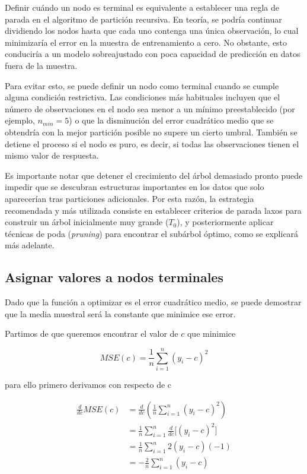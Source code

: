 Definir cuándo un nodo es terminal es equivalente a establecer una regla de parada en el algoritmo de partición recursiva. En teoría, se podría continuar dividiendo los nodos hasta que cada uno contenga una única observación, lo cual minimizaría el error en la muestra de entrenamiento a cero. No obstante, esto conduciría a un modelo sobreajustado con poca capacidad de predicción en datos fuera de la muestra.

Para evitar esto, se puede definir un nodo como terminal cuando se cumple alguna condición restrictiva. Las condiciones más habituales incluyen que el número de observaciones en el nodo sea menor a un mínimo preestablecido (por ejemplo, $n_{min} = 5$) o que la disminución del error cuadrático medio que se obtendría con la mejor partición posible no supere un cierto umbral. También se detiene el proceso si el nodo es puro, es decir, si todas las observaciones tienen el mismo valor de respuesta.

Es importante notar que detener el crecimiento del árbol demasiado pronto puede impedir que se descubran estructuras importantes en los datos que solo aparecerían tras particiones adicionales. Por esta razón, la estrategia recomendada y más utilizada consiste en establecer criterios de parada laxos para construir un árbol inicialmente muy grande ($T_0$), y posteriormente aplicar técnicas de poda (\textit{pruning}) para encontrar el subárbol óptimo, como se explicará más adelante.

\subsection{Asignar valores a nodos terminales}

Dado que la función a optimizar es el error cuadrático medio, se puede demostrar que la media muestral será la constante que minimice ese error.

Partimos de que queremos encontrar el valor de $c$ que minimice

\begin{equation}
    MSE(c)=\frac{1}{n}\sum_{i=1}^{n}(y_i-c)^2 
\end{equation}
	
para ello primero derivamos con respecto de c

\begin{equation}
    \begin{aligned}
        \frac{d}{dc} MSE(c)
        &= \frac{d}{dc}\left(\frac{1}{n}\sum_{i=1}^{n}(y_i-c)^2\right) \\
        &= \frac{1}{n}\sum_{i=1}^{n} \frac{d}{dc}\big[(y_i-c)^2\big] \\
        &= \frac{1}{n}\sum_{i=1}^{n} 2(y_i-c)(-1) \\
        &= -\frac{2}{n}\sum_{i=1}^{n}(y_i-c) \\
    \end{aligned}
\end{equation}

